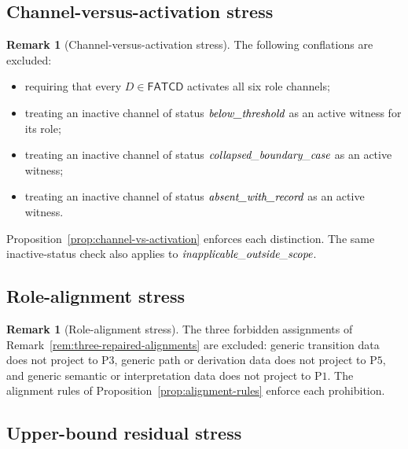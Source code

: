 \documentclass[11pt]{article}
\theoremstyle{definition}
\newtheorem{remark}[theorem]{Remark}
\newcommand{\FATCD}{\ensuremath{\mathsf{FATCD}}}
\newcommand{\belowthr}{\textit{below\_\allowbreak threshold}}
\newcommand{\collapsedbc}{\textit{collapsed\_\allowbreak boundary\_\allowbreak case}}
\newcommand{\absentrec}{\textit{absent\_\allowbreak with\_\allowbreak record}}
\newcommand{\outsidescope}{\textit{inapplicable\_\allowbreak outside\_\allowbreak scope}}
\newcommand{\Pone}{\ensuremath{\mathrm{P1}}}
\newcommand{\Pthree}{\ensuremath{\mathrm{P3}}}
\newcommand{\Pfive}{\ensuremath{\mathrm{P5}}}
\begin{document}
\subsection{Channel-versus-activation stress}\label{subsec:channel-activation-stress}

\begin{remark}[Channel-versus-activation stress]\label{prop:channel-activation-stress}
The following conflations are excluded:
\begin{itemize}[topsep=2pt,itemsep=1pt]
  \item requiring that every \(D \in \FATCD{}\) activates all six role
    channels;
  \item treating an inactive channel of status \(\belowthr\) as an
    active witness for its role;
  \item treating an inactive channel of status \(\collapsedbc\) as an
    active witness;
  \item treating an inactive channel of status \(\absentrec\) as an
    active witness.
\end{itemize}
Proposition~\ref{prop:channel-vs-activation} enforces each distinction.
The same inactive-status check also applies to
\(\outsidescope\).
\end{remark}

\subsection{Role-alignment stress}\label{subsec:role-alignment-stress}

\begin{remark}[Role-alignment stress]\label{prop:role-alignment-stress}
The three forbidden assignments of
Remark~\ref{rem:three-repaired-alignments} are excluded: generic
transition data does not project to \Pthree{}, generic path or
derivation data does not project to \Pfive{}, and generic semantic or
interpretation data does not project to \Pone{}. The alignment rules
of Proposition~\ref{prop:alignment-rules} enforce each prohibition.
\end{remark}

\subsection{Upper-bound residual stress}\label{subsec:upper-bound-residual-stress}
\end{document}
